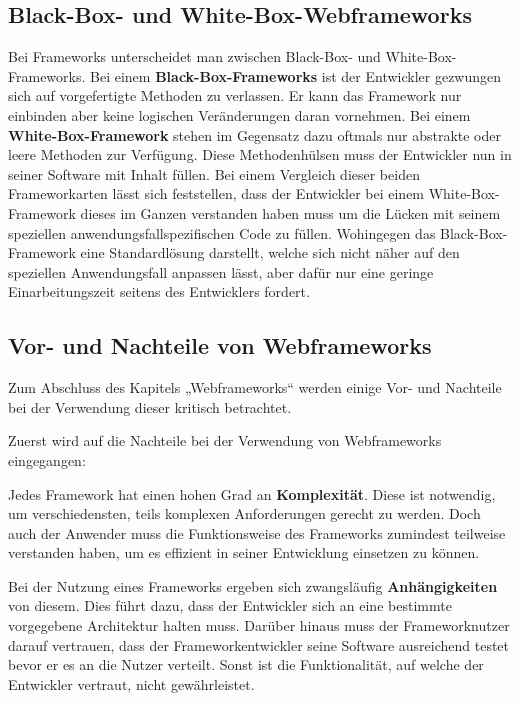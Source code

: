 \subsection{Black-Box- und White-Box-Webframeworks}\label{sec:FWTypen}

Bei Frameworks unterscheidet man zwischen Black-Box- und White-Box-Frameworks. Bei einem \textbf{Black-Box-Frameworks} ist der Entwickler gezwungen sich auf vorgefertigte Methoden zu verlassen. Er kann das Framework nur einbinden aber keine logischen Veränderungen daran vornehmen. Bei einem \textbf{White-Box-Framework} stehen im Gegensatz dazu oftmals nur abstrakte oder leere Methoden zur Verfügung. Diese Methodenhülsen muss der Entwickler nun in seiner Software mit Inhalt füllen. Bei einem Vergleich dieser beiden Frameworkarten lässt sich feststellen, dass der Entwickler bei einem White-Box-Framework dieses im Ganzen verstanden haben muss um die Lücken mit seinem speziellen anwendungsfallspezifischen Code zu füllen. Wohingegen das Black-Box-Framework eine Standardlösung darstellt, welche sich nicht näher auf den speziellen Anwendungsfall anpassen lässt, aber dafür nur eine geringe Einarbeitungszeit seitens des Entwicklers fordert.\autocites[vgl.][2]{Kojarski2006}

\subsection{Vor- und Nachteile von Webframeworks}

Zum Abschluss des Kapitels „Webframeworks“ werden einige Vor- und Nachteile bei der Verwendung dieser kritisch betrachtet. 

Zuerst wird auf die Nachteile bei der Verwendung von Webframeworks eingegangen:

Jedes Framework hat einen hohen Grad an \textbf{Komplexität}. Diese ist notwendig, um verschiedensten, teils komplexen Anforderungen gerecht zu werden. Doch auch der Anwender muss die Funktionsweise des Frameworks zumindest teilweise verstanden haben, um es effizient in seiner Entwicklung einsetzen zu können.

Bei der Nutzung eines Frameworks ergeben sich zwangsläufig \textbf{Anhängigkeiten} von diesem. Dies führt dazu, dass der Entwickler sich an eine bestimmte vorgegebene Architektur halten muss. Darüber hinaus muss der Frameworknutzer darauf vertrauen, dass der Frameworkentwickler seine Software ausreichend testet bevor er es an die Nutzer verteilt. Sonst ist die Funktionalität, auf welche der Entwickler vertraut, nicht gewährleistet.

